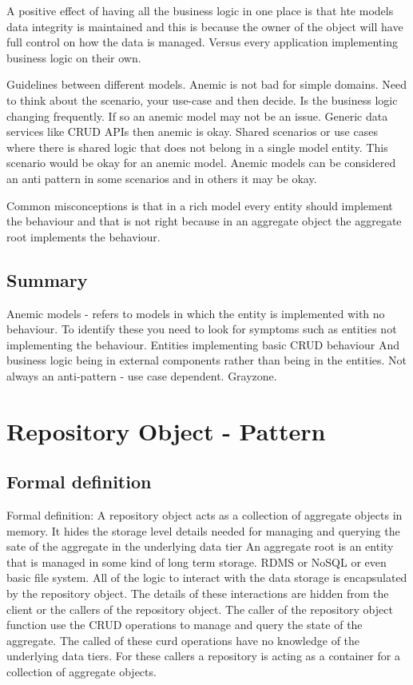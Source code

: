 A positive effect of having all the business logic in one place is that hte models data integrity is maintained and this is because the owner of the object will have full control on how the data is managed.
Versus every application implementing business logic on their own.

Guidelines between different models.
Anemic is not bad for simple domains.
Need to think about the scenario, your use-case and then decide.
Is the business logic changing frequently. If so an anemic model may not be an issue.
Generic data services like CRUD APIs then anemic is okay.
Shared scenarios or use cases where there is shared logic that does not belong in a single model entity.
This scenario would be okay for an anemic model.
Anemic models can be considered an anti pattern in some scenarios and in others it may be okay.

Common misconceptions is that in a rich model every entity should implement the behaviour and that is not right because in an aggregate object the aggregate root implements the behaviour.

\subsection{Summary}
Anemic models - refers to models in which the entity is implemented with no behaviour.
To identify these you need to look for symptoms such as entities not implementing the behaviour.
Entities implementing basic CRUD behaviour
And business logic being in external components rather than being in the entities.
Not always an anti-pattern - use case dependent. Grayzone.

\section{Repository Object - Pattern}

\subsection{Formal definition}
Formal definition: A repository object acts as a collection of aggregate objects in memory.
It hides the storage level details needed for managing and querying the sate of the aggregate in the underlying data tier
An aggregate root is an entity that is managed in some kind of long term storage.
RDMS or NoSQL or even basic file system.
All of the logic to interact with the data storage is encapsulated by the repository object.
The details of these interactions are hidden from the client or the callers of the repository object.
The caller of the repository object function use the CRUD operations to manage and query the state of the aggregate.
The called of these curd operations have no knowledge of the underlying data tiers.
For these callers a repository is acting as a container for a collection of aggregate objects.

